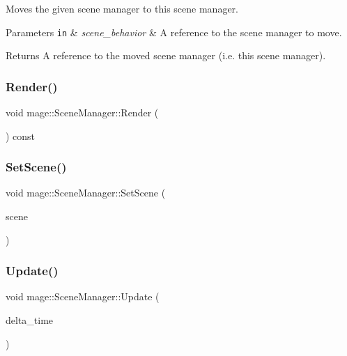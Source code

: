 Moves the given scene manager to this scene manager.


\begin{DoxyParams}[1]{Parameters}
\mbox{\tt in}  & {\em scene\+\_\+behavior} & A reference to the scene manager to move. \\
\hline
\end{DoxyParams}
\begin{DoxyReturn}{Returns}
A reference to the moved scene manager (i.\+e. this scene manager). 
\end{DoxyReturn}
\hypertarget{classmage_1_1_scene_manager_a05c854e957e3f78e243efe3e422955a6}{}\label{classmage_1_1_scene_manager_a05c854e957e3f78e243efe3e422955a6} 
\subsubsection{\texorpdfstring{Render()}{Render()}}
{\footnotesize\ttfamily void mage\+::\+Scene\+Manager\+::\+Render (\begin{DoxyParamCaption}{ }\end{DoxyParamCaption}) const}

\hypertarget{classmage_1_1_scene_manager_abd9572b72caa412eda1f6c4e5d771fc3}{}\label{classmage_1_1_scene_manager_abd9572b72caa412eda1f6c4e5d771fc3} 
\subsubsection{\texorpdfstring{Set\+Scene()}{SetScene()}}
{\footnotesize\ttfamily void mage\+::\+Scene\+Manager\+::\+Set\+Scene (\begin{DoxyParamCaption}\item[{\hyperlink{namespacemage_a3316d7143a973e37adf1110f2e80ca31}{Unique\+Ptr}$<$ \hyperlink{classmage_1_1_scene}{Scene} $>$ \&\&}]{scene }\end{DoxyParamCaption})}

\hypertarget{classmage_1_1_scene_manager_a10c718ddfca8caa4bdc6f1cbf1daf12f}{}\label{classmage_1_1_scene_manager_a10c718ddfca8caa4bdc6f1cbf1daf12f} 
\subsubsection{\texorpdfstring{Update()}{Update()}}
{\footnotesize\ttfamily void mage\+::\+Scene\+Manager\+::\+Update (\begin{DoxyParamCaption}\item[{\hyperlink{namespacemage_ad26233bbec640deda836e572c1a23708}{F64}}]{delta\+\_\+time }\end{DoxyParamCaption})}



